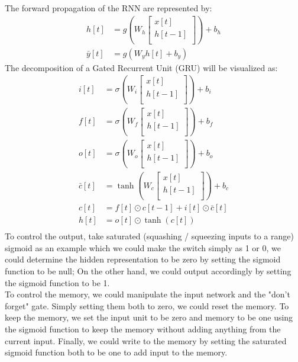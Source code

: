 The forward propagation of the RNN are represented by:\\
\begin{align*}
    h[t] & = g(W_{h} \begin{bmatrix}
        x[t] \\
        h[t - 1] \\
    \end{bmatrix}) + b_{h}\\
    \bar{y}[t] & = g(W_{y}h[t] + b_{y})
\end{align*}
The decomposition of a Gated Recurrent Unit (GRU) will be visualized as:\\
\begin{align*}
i[t] & = \sigma(W_{i} \begin{bmatrix} x[t] \\ h[t - 1] \\ \end{bmatrix}) + b_{i}\\
f[t] & = \sigma(W_{f} \begin{bmatrix} x[t] \\ h[t - 1] \\ \end{bmatrix}) + b_{f}\\ 
o[t] & = \sigma(W_{o} \begin{bmatrix} x[t] \\ h[t - 1] \\ \end{bmatrix}) + b_{o}\\
\bar{c}[t] & = \tanh(W_{c} \begin{bmatrix} x[t] \\ h[t - 1] \\ \end{bmatrix}) + b_{c}\\
c[t] & = f[t] \odot c[t-1] + i[t] \odot \bar{c}[t]\\
h[t] & = o[t] \odot \tanh(c[t])\\
\end{align*}
To control the output, take saturated (squashing / squeezing inputs to a range) sigmoid as an example which we could make the switch simply as 1 or 0, we could determine the hidden representation to be zero by setting the sigmoid function to be null; On the other hand, we could output accordingly by setting the sigmoid function to be 1.\\

To control the memory, we could manipulate the input network and the "don't forget" gate. Simply setting them both to zero, we could reset the memory. To keep the memory, we set the input unit to be zero and memory to be one using the sigmoid function to keep the memory without adding anything from the current input. Finally, we could write to the memory by setting the saturated sigmoid function both to be one to add input to the memory.\\

